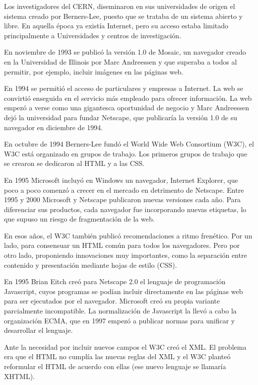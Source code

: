 \documentclass[a4paper, 12pt]{book}
\begin{document}
Los investigadores del CERN,  diseminaron en sus universidades de origen el sistema creado por Berners-Lee, puesto que se trataba de un sistema abierto y libre. En aquella \'epoca ya exist\'ia Internet, pero su acceso estaba limitado principalmente a Universidades y centros de investigaci\'on.

En noviembre de 1993 se public\'o la versi\'on 1.0 de Mosaic, un navegador creado en la Universidad de Illinois por Marc Andreessen y que superaba a todos al permitir, por ejemplo, incluir im\'agenes en las p\'aginas web.

En 1994 se permiti\'o el acceso de particulares y empresas a Internet. La web se convirti\'o enseguida en el servicio m\'as empleado para ofrecer informaci\'on. La web empez\'o a verse como una gigantesca oportunidad de negocio y Marc Andreessen dej\'o la universidad para fundar Netscape, que publicar\'ia la versi\'on 1.0 de su navegador en diciembre de 1994.

En octubre de 1994 Berners-Lee fund\'o el World Wide Web Consortium (W3C), el W3C est\'a organizado en grupos de trabajo. Los primeros grupos de trabajo que se crearon se dedicaron al HTML y a las CSS.

En 1995 Microsoft incluy\'o en Windows un navegador, Internet Explorer, que poco a poco comenz\'o a crecer en el mercado en detrimento de Netscape. Entre 1995 y 2000 Microsoft y Netscape publicaron nuevas versiones cada a\~no. Para diferenciar sus productos, cada navegador fue incorporando nuevas etiquetas, lo que supuso un riesgo de fragmentaci\'on de la web.

En esos a\~nos, el W3C tambi\'en public\'o recomendaciones a ritmo fren\'etico. Por un lado, para consensuar un HTML com\'un para todos los navegadores. Pero por otro lado, proponiendo innovaciones muy importantes, como la separaci\'on entre contenido y presentaci\'on mediante hojas de estilo (CSS).

En 1995 Brian Eitch cre\'o para Netscape 2.0 el lenguaje de programaci\'on Javascript, cuyos programas se pod\'ian incluir directamente en las p\'aginas web para ser ejecutados por el navegador. Microsoft cre\'o su propia variante parcialmente incompatible. La normalizaci\'on de Javascript la llev\'o a cabo la organizaci\'on ECMA, que en 1997 empez\'o a publicar normas para unificar y desarrollar el lenguaje.

Ante la necesidad por incluir nuevos campos el W3C cre\'o el XML. El problema era que el HTML no cumpl\'ia las nuevas reglas del XML y el W3C plante\'o reformular el HTML de acuerdo con ellas (ese nuevo lenguaje se llamar\'ia XHTML).
\end{document}
